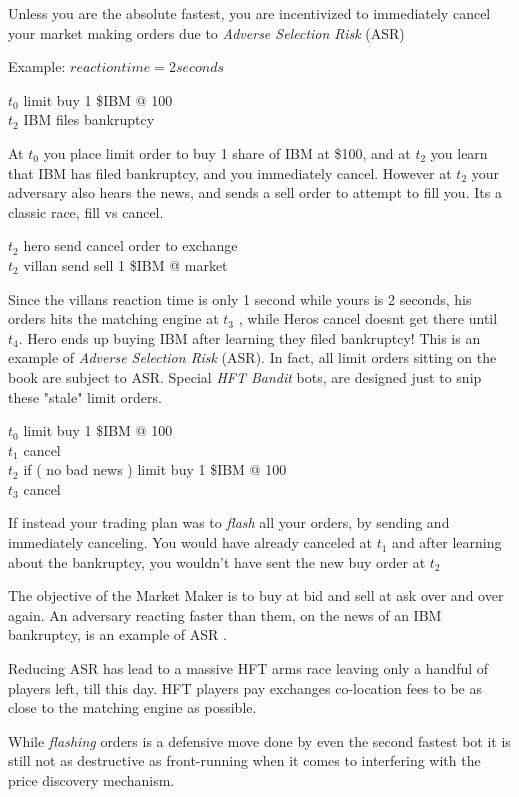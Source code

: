 \documentclass[12pt]{article}
\begin{document}
Unless you are the absolute fastest, you are incentivized to immediately cancel your market making orders due to \emph{Adverse Selection Risk } (ASR)  

Example: \( reaction time = 2 seconds \) 

$t_0$ limit buy 1 \$IBM @ 100 \\
$t_2$ IBM files bankruptcy 

At $t_0$ you place limit order to buy 1 share of IBM at \$100, and at $t_2$ you learn that IBM has filed bankruptcy, and you immediately cancel. However at $t_2$ your adversary also hears the news, and sends a sell order to attempt to fill you. Its a classic race, fill vs cancel.

$t_2$ hero send cancel order to exchange  \\
$t_2$ villan send sell 1 \$IBM @ market  

Since the villans reaction time is only 1 second while yours is 2 seconds, his orders hits the matching engine at $t_3$ , while Heros cancel doesnt get there until $t_4$. Hero ends up buying IBM after learning they filed bankruptcy! This is an example of \emph{Adverse Selection Risk} (ASR). In fact, all limit orders sitting on the book are subject to ASR. Special \emph{HFT Bandit} bots, are designed just to snip these "stale" limit orders. 

$t_0$ limit buy 1 \$IBM @ 100 \\
$t_1$ cancel \\
$t_2$ if ( no bad news ) limit buy 1 \$IBM @ 100 \\
$t_3$ cancel 

If instead your trading plan was to \emph{flash} all your orders, by sending and immediately canceling. You would have already canceled at $t_1$ and after learning about the bankruptcy, you wouldn't have sent the new buy order at $t_2$

The objective of the Market Maker is to buy at bid and sell at ask over and over again. An adversary reacting faster than them, on the news of an IBM bankruptcy, is an example of ASR . 

Reducing ASR has lead to a massive HFT arms race \cite{notsure} leaving only a handful of players left, till this day. HFT players pay exchanges co-location fees to be as close to the matching engine as possible. 

While \emph{flashing} orders is a defensive move done by even the second fastest bot it is still not as destructive as front-running when it comes to interfering with the price discovery mechanism. 
\end{document}
